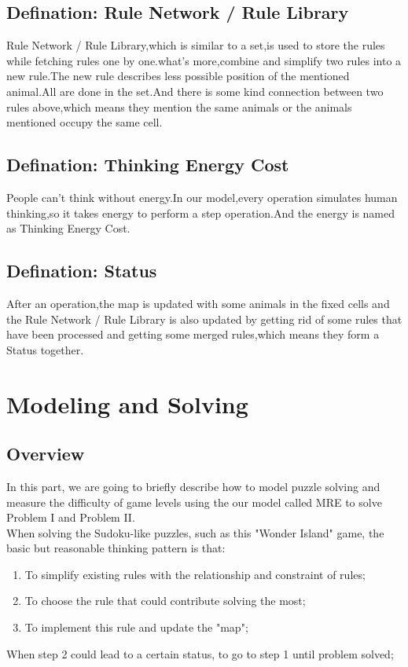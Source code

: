 \documentclass[12pt,a4paper,]{article}
\begin{document}
\subsection{Defination: Rule Network / Rule Library}
Rule Network / Rule Library,which is similar to a set,is used to store the rules while fetching rules one by one.what's more,combine and simplify two rules  into a new rule.The new rule describes less possible position of the mentioned animal.All are done in the set.And there is some kind connection between two rules above,which means they mention the same animals or the animals mentioned occupy the same cell.
\subsection{Defination: Thinking Energy Cost}
 People can't think without energy.In our model,every operation simulates human thinking,so it takes energy to perform a step operation.And the energy is named as Thinking Energy Cost.
\subsection{Defination: Status}
After an operation,the map is updated with some animals in the fixed cells and the Rule Network / Rule Library is also updated by getting rid of some rules that have been processed and  getting some merged rules,which means they form a Status together.


\section{Modeling and Solving}
\subsection{Overview}
In this part, we are going to briefly describe how to model puzzle solving and measure the difficulty of game levels using the our model called MRE to solve Problem I and Problem II. 
~\\

When solving the Sudoku-like puzzles, such as this "Wonder Island" game, the basic but reasonable thinking pattern is that:
\begin{enumerate}[(1)]
\item To simplify existing rules with the relationship and constraint of rules;
\item To choose the rule that could contribute solving the most;
\item To implement this rule and update the "map";
\end{enumerate}
When step 2 could lead to a certain status, to go to step 1 until problem solved;
\end{document}
